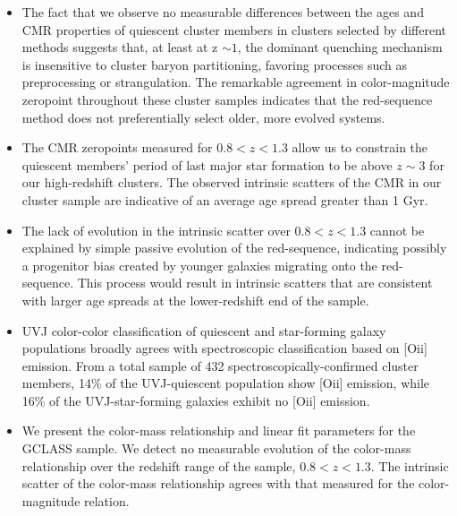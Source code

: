 \begin{itemize}

\item
The fact that we observe no measurable differences between the ages and CMR properties of quiescent cluster members in clusters selected by different methods suggests that, at least at z $\sim 1$, the dominant quenching mechanism is insensitive to cluster baryon partitioning, favoring processes such as preprocessing or strangulation.
The remarkable agreement in color-magnitude zeropoint throughout these cluster samples indicates that the red-sequence method does not preferentially select older, more evolved systems.

\item
The CMR zeropoints measured for $0.8 < z < 1.3$ allow us to constrain the quiescent members' period of last major star formation to be above $z \sim 3$ for our high-redshift clusters. The observed intrinsic scatters of the CMR in our cluster sample are indicative of an average age spread greater than 1 Gyr.

\item The lack of evolution in the intrinsic scatter over $0.8 < z < 1.3$ cannot be explained by simple passive evolution of the red-sequence, indicating possibly a progenitor bias created by younger galaxies migrating onto the red-sequence. This process would result in intrinsic scatters that are consistent with larger age spreads at the lower-redshift end of the sample.

\item UVJ color-color classification of quiescent and star-forming galaxy populations broadly agrees with spectroscopic classification based on [O{\sc ii}] emission. From a total sample of 432 spectroscopically-confirmed cluster members, 14\% of the UVJ-quiescent population show [O{\sc ii}] emission, while 16\% of the UVJ-star-forming galaxies exhibit no [O{\sc ii}] emission.

\item We present the color-mass relationship and linear fit parameters for the GCLASS sample. We detect no measurable evolution of the color-mass relationship over the redshift range of the sample, $0.8 < z < 1.3$. The intrinsic scatter of the color-mass relationship agrees with that measured for the color-magnitude relation.

\end{itemize}


